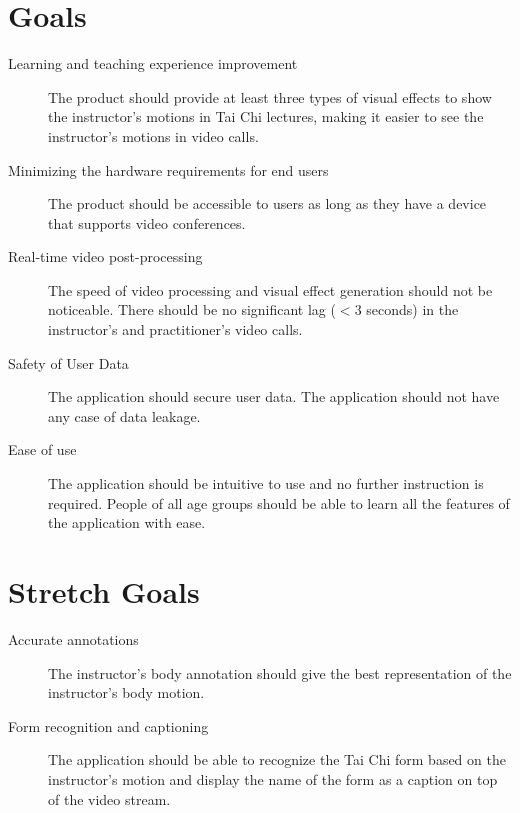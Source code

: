 \documentclass{article}
\begin{document}
\section{Goals}

\begin{description}
\item[Learning and teaching experience improvement] The product should provide at
  least three types of visual effects to show the instructor's motions in Tai
  Chi lectures, making it easier to see the instructor's motions in video calls.
\item[Minimizing the hardware requirements for end users] The product should be
  accessible to users as long as they have a device that supports video
  conferences.
\item[Real-time video post-processing] The speed of video processing and visual
  effect generation should not be noticeable. There should be no significant lag
  (\(< 3\) seconds) in the instructor's and practitioner's video calls.
\item[Safety of User Data] The application should secure user data. The application
  should not have any case of data leakage.
\item[Ease of use] The application should be intuitive to use and no further
  instruction is required. People of all age groups should be able to learn all
  the features of the application with ease.
\end{description}

\section{Stretch Goals}

\begin{description}
\item[Accurate annotations] The instructor's body annotation should give the best
  representation of the instructor's body motion.
\item[Form recognition and captioning] The application should be able to recognize
  the Tai Chi form based on the instructor's motion and display the name of the
  form as a caption on top of the video stream.
\end{description}
\end{document}
